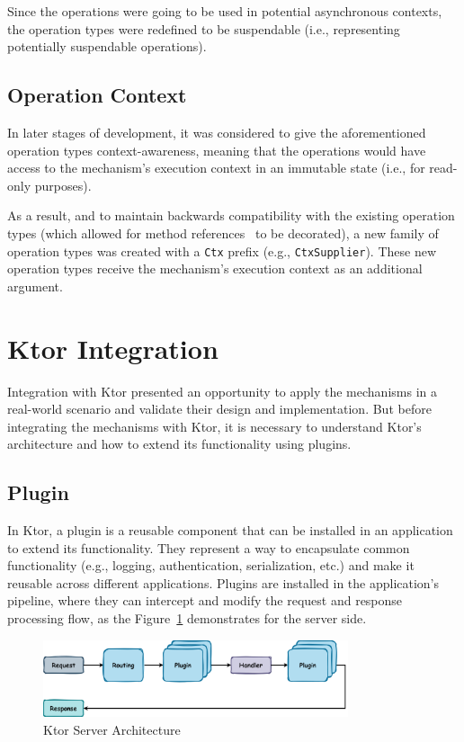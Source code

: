 Since the operations were going to be used in potential asynchronous contexts,
the operation types were redefined to be suspendable (i.e., representing potentially suspendable operations).

\subsection{Operation Context}\label{subsec:operation-context}

In later stages of development, it was considered to give the aforementioned operation types context-awareness,
meaning that the operations would have access to the mechanism's execution context in an immutable state
(i.e., for read-only purposes).

As a result, and to maintain backwards compatibility with the existing operation types (which allowed for method references~\cite{java-method-references} to be decorated), a new family of operation types was created with a \texttt{Ctx} prefix (e.g., \texttt{CtxSupplier}).
These new operation types receive the mechanism's execution context as an additional argument.


\section{Ktor Integration}\label{sec:ktor-integration}

Integration with Ktor presented an opportunity to apply the mechanisms in a real-world scenario
and validate their design and implementation.
But before integrating the mechanisms with Ktor, it is necessary to understand Ktor's architecture and how to extend its functionality using plugins.

\subsection{Plugin}\label{subsec:plugin}

In Ktor, a plugin is a reusable component that can be installed in an application to extend its functionality.
They represent a way to encapsulate common functionality (e.g., logging, authentication, serialization, etc.) and make it reusable across different applications.
Plugins are installed in the application's pipeline, where they can intercept and modify the request and response processing flow, as the Figure~\ref{fig:ktor-server-architecture} demonstrates for the server side.

\begin{figure}[!htb]
    \centering
    \includegraphics[width=0.8\textwidth]{../figures/03_ktor-server-architecture}
    \caption{Ktor Server Architecture}
    \label{fig:ktor-server-architecture}
\end{figure}


